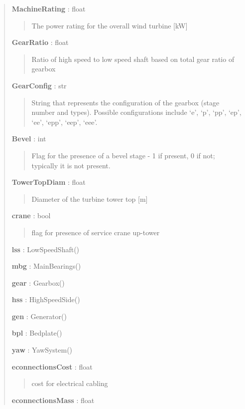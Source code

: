 \documentclass[letterpaper,10pt,openany,oneside]{sphinxmanual}
\begin{document}
\begin{fulllineitems}
\begin{quote}
\begin{description}
\textbf{MachineRating} : float
\begin{quote}

The power rating for the overall wind turbine {[}kW{]}
\end{quote}

\textbf{GearRatio} : float
\begin{quote}

Ratio of high speed to low speed shaft based on total gear ratio of gearbox
\end{quote}

\textbf{GearConfig} : str
\begin{quote}

String that represents the configuration of the gearbox (stage number and types).
Possible configurations include `e', `p', `pp', `ep', `ee', `epp', `eep', `eee'.
\end{quote}

\textbf{Bevel} : int
\begin{quote}

Flag for the presence of a bevel stage - 1 if present, 0 if not; typically it is not present.
\end{quote}

\textbf{TowerTopDiam} : float
\begin{quote}

Diameter of the turbine tower top {[}m{]}
\end{quote}

\textbf{crane} : bool
\begin{quote}

flag for presence of service crane up-tower
\end{quote}

\textbf{lss} : LowSpeedShaft()

\textbf{mbg} : MainBearings()

\textbf{gear} : Gearbox()

\textbf{hss} : HighSpeedSide()

\textbf{gen} : Generator()

\textbf{bpl} : Bedplate()

\textbf{yaw} : YawSystem()

\textbf{econnectionsCost} : float
\begin{quote}

cost for electrical cabling
\end{quote}

\textbf{econnectionsMass} : float
\begin{quote}


\end{quote}
\end{description}
\end{quote}
\end{fulllineitems}
\end{document}
